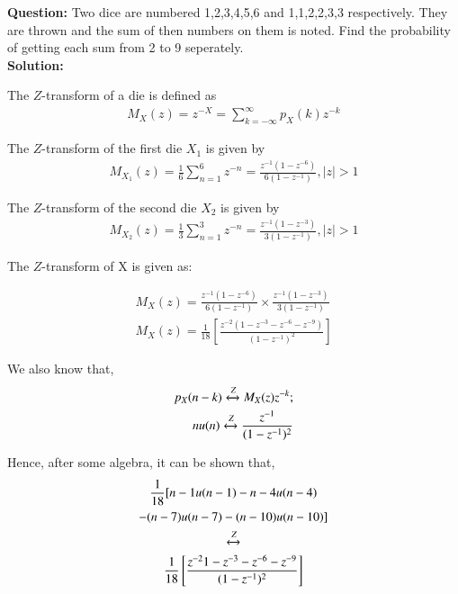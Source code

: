 \documentclass[journal,12pt,twocolumn]{IEEEtran}
\theoremstyle{remark}
\begin{document}



\textbf{Question:} Two dice are numbered 1,2,3,4,5,6 and 1,1,2,2,3,3 respectively. They are thrown and the sum of then numbers on them 
is noted. Find the probability of getting each sum from 2 to 9 seperately.\\
\textbf{Solution:}

The $Z$-transform of a die is defined as
\begin{align}
M_X(z) = {z^{-X}} = \sum_{k=-\infty}^{\infty}p_X(k)z^{-k}
\end{align}

The $Z$-transform of the first die $X_1$ is given by 
\begin{align}
M_{X_1}(z) =  \frac{1}{6}\sum_{n = 1}^{6}z^{-n}
=\frac{z^{-1}{(1-z^{-6})}}{6{(1-z^{-1})}}, {|z|} > 1
\end{align}

The $Z$-transform of the second die $X_2$ is given by 
\begin{align}
M_{X_2}(z) =  \frac{1}{3}\sum_{n = 1}^{3}z^{-n}
=\frac{z^{-1}{(1-z^{-3})}}{3{(1-z^{-1})}}, {|z|} > 1
\end{align}

The $Z$-transform of X is given as:

\begin{align}
  M_X(z) = \frac{z^{-1}{(1-z^{-6})}}{6{(1-z^{-1})}} \times \frac{z^{-1}{(1-z^{-3})}}{3{(1-z^{-1})}}
\\
  M_X(z) = \frac{1}{18}\left[\frac{z^{-2}{(1-z^{-3}-z^{-6}-z^{-9})}}{{(1-z^{-1})}^2}\right]
\end{align}

We also know that,
\begin{align}
p_X(n-k) \xleftrightarrow{Z} M_X(z)z^{-k}; \\
nu(n) \xleftrightarrow{Z} \frac{z^{-1}}{({1-z^{-1}})^2}
\end{align}

Hence, after some algebra, it can be shown that,
\begin{multline}
\frac{1}{18}[{{n-1}u(n-1)-{n-4}u(n-4)}\\
{-(n-7)u(n-7)-(n-10)u(n-10)}]\\
\xleftrightarrow{Z}\\
\frac{1}{18} \left[{\frac{z^{-2}{1-z^{-3}-z^{-6}-z^{-9}}}{({1-z^{-1}})^2}}\right]
\end{multline}
\end{document}
